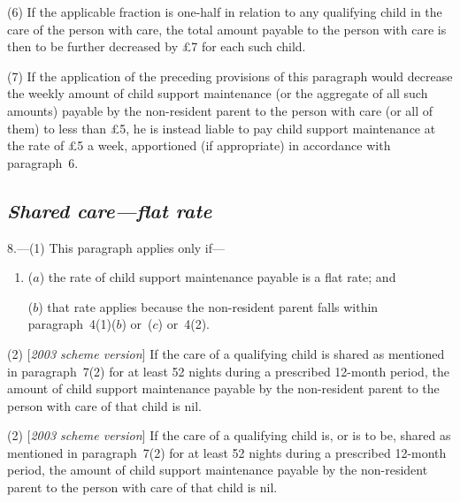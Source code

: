 \documentclass[12pt,a4paper]{article}
\begin{document}
(6) If the applicable fraction is one-half in relation to any qualifying child in the care of the person with care, the total amount payable to the person with care is then to be further decreased by £7 for each such child.

(7) If the application of the preceding provisions of this paragraph would decrease the weekly amount of child support maintenance (or the aggregate of all such amounts) payable by the non-resident parent to the person with care (or all of them) to less than £5, he is instead liable to pay child support maintenance at the rate of £5 a week, apportioned (if appropriate) in accordance with paragraph~6. 


\subsection*{\itshape Shared care—flat rate}

8.---(1) This paragraph applies only if—
\begin{enumerate}\item[]
($a$) the rate of child support maintenance payable is a flat rate; and

($b$) that rate applies because the non-resident parent falls within paragraph~4(1)($b$)  or~($c$)  or~4(2).
\end{enumerate}

(2) [\emph{2003 scheme version}] If the care of a qualifying child is shared as mentioned in paragraph~7(2)  for at least 52 nights during a prescribed 12-month period, the amount of child support maintenance payable by the non-resident parent to the person with care of that child is nil.

(2) [\emph{2003 scheme version}] 
If the care of a qualifying child is, or is to be, shared  %
as mentioned in paragraph~7(2)  for at least 52 nights during a prescribed 12-month period, the amount of child support maintenance payable by the non-resident parent to the person with care of that child is nil.
\end{document}
